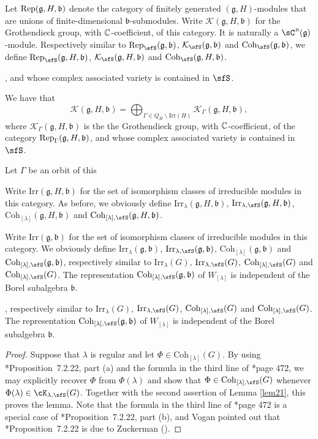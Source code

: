 \documentclass[12pt,a4paper]{amsart}
\newcommand{\CK}{{\mathcal {K}}}
\newcommand{\CR}{{\mathcal {R}}}
\newcommand{\g}{\mathfrak g}
\renewcommand{\b}{\mathfrak b}
\numberwithin{equation}{section}
\theoremstyle{remark}
\def\Irr{\mathrm{Irr}}
\def\CR{{\sC}^{\scriptscriptstyle R}}
\def\Coh{\mathrm{Coh}}
\newcommand{\Lam}{{[\lambda]}}
\newcommand{\Grt}{\cK}
\begin{document}
Let $\Rep(\g,H,\b)$ denote the category of finitely generated $(\g, H)$-modules that  are unions of finite-dimensional $\b$-submodules.  Write $\CK(\g,H,\b)$ for the Grothendieck group, with $\mathbb{C}$-coefficient, of this category. It is naturally a $\CR(\g)$-module. Respectively similar to  $\Rep_\sfS(\g,\b)$, $\CK_\sfS(\g,\b)$ and  $\Coh_\sfS(\g,\b)$, we define $\Rep_\sfS(\g,H,\b)$, $\CK_\sfS(\g,H, \b)$ and  $\Coh_\sfS(\g,H, \b)$.



, and
whose complex associated variety is contained in $\sfS$.


We have that
\[
\CK(\g,H,\b)=\bigoplus_{\Gamma\in Q_H\backslash \Irr(H)} \CK_{\Gamma}(\g,H,\b),
\]
where $ \CK_{\Gamma}(\g,H,\b)$ is the the  Grothendieck group, with $\mathbb{C}$-coefficient, of the category $\Rep_\Gamma(\g,H,\b)$, and
whose complex associated variety is contained in $\sfS$.


Let $\Gamma$ be an orbit of this



Write $\Irr(\g,H, \b)$ for the set of isomorphism classes of irreducible modules in this category.
As before, we  obviously define  $\Irr_{\lambda}(\g,H, \b)$,  $\Irr_{\lambda,\sfS}(\g,H, \b)$,   $\Coh_{\Lam}(\g,H, \b)$ and $\Coh_{\Lam,\sfS}(\g,H, \b)$.



Write $\Irr(\g,\b)$ for the set of isomorphism classes of irreducible modules in this category.
We  obviously define  $\Irr_{\lambda}(\g,\b)$,  $\Irr_{\lambda,\sfS}(\g,\b)$,   $\Coh_{\Lam}(\g,\b)$ and $\Coh_{\Lam,\sfS}(\g,\b)$,
 respectively similar to  $\Irr_{\lambda}(G)$,  $\Irr_{\lambda,\sfS}(G)$,   $\Coh_{\Lam,\sfS}(G)$ and  $\Coh_{\Lam,\sfS}(G)$. The representation  $\Coh_{\Lam,\sfS}(\g,\b)$ of $W_{[\lambda]}$
is independent of the Borel subalgebra $\b$.


,
 respectively similar to  $\Irr_{\lambda}(G)$,  $\Irr_{\lambda,\sfS}(G)$,   $\Coh_{\Lam,\sfS}(G)$ and  $\Coh_{\Lam,\sfS}(G)$. The representation  $\Coh_{\Lam,\sfS}(\g,\b)$ of $W_{[\lambda]}$
is independent of the Borel subalgebra $\b$.


\begin{proof}
Suppose that $\lambda$ is regular and let $\Phi\in   \Coh_{[\lambda]}(G)$. By using \cite{Vg}*{Proposition~7.2.22, part (a)}  and the formula in the third line of  \cite{Vg}*{page 472}, we may explicitly recover $\Phi$ from $\Phi(\lambda)$ and show that $\Phi\in \Coh_{[\lambda],\sfS}(G)$ whenever $\Phi(\lambda)\in \Grt_{\lambda, \sfS}(G)$.   Together with the second assertion of Lemma \ref{lem21}, this proves the lemma. Note that the formula in the third line of  \cite{Vg}*{page 472} is a special case of  \cite{Vg}*{Proposition~7.2.22, part (b)}, and Vogan pointed out that \cite{Vg}*{Proposition~7.2.22} is due to Zuckerman (\cite{Zu}).

\end{proof}
\end{document}

